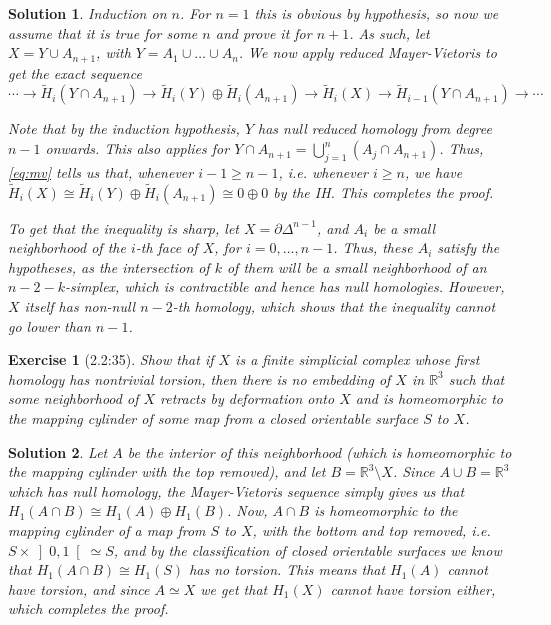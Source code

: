 \documentclass{article}
\theoremstyle{plain}
\newtheorem*{ex}{Exercise}
\theoremstyle{nonumberplain}
\newtheorem{sol}{Solution}
\newcommand{\R}{\mathbb{R}}
\begin{document}
\begin{sol}
Induction on $n$. For $n = 1$ this is obvious by hypothesis, so now we assume that it is true for some $n$ and prove it for $n+1$. As such, let $X = Y \cup A_{n+1}$, with $Y = A_1 \cup \dots \cup A_n$. We now apply reduced Mayer-Vietoris to get the exact sequence
\begin{equation}\label{eq:mv}
\cdots \to \tilde H_i(Y \cap A_{n+1}) \to \tilde H_i(Y) \oplus \tilde H_i(A_{n+1}) \to \tilde H_i(X) \to \tilde H_{i-1}(Y \cap A_{n+1}) \to \cdots
\end{equation}

Note that by the induction hypothesis, $Y$ has null reduced homology from degree $n-1$ onwards. This also applies for $Y \cap A_{n+1} = \bigcup_{j=1}^n (A_j \cap A_{n+1})$. Thus, \eqref{eq:mv} tells us that, whenever $i-1 \geq n-1$, i.e. whenever $i \geq n$, we have $\tilde H_i(X) \cong \tilde H_i(Y) \oplus \tilde H_i(A_{n+1}) \cong 0 \oplus 0$ by the IH. This completes the proof.

To get that the inequality is sharp, let $X = \partial \Delta^{n-1}$, and $A_i$ be a small neighborhood of the $i$-th face of $X$, for $i = 0, \dots, n-1$. Thus, these $A_i$ satisfy the hypotheses, as the intersection of $k$ of them will be a small neighborhood of an $n-2-k$-simplex, which is contractible and hence has null homologies. However, $X$ itself has non-null $n-2$-th homology, which shows that the inequality cannot go lower than $n-1$.
\end{sol}

\begin{ex}[2.2:35]
Show that if $X$ is a finite simplicial complex whose first homology has nontrivial torsion, then there is no embedding of $X$ in $\R^3$ such that some neighborhood of $X$ retracts by deformation onto $X$ and is homeomorphic to the mapping cylinder of some map from a closed orientable surface $S$ to $X$.
\end{ex}

\begin{sol}
Let $A$ be the interior of this neighborhood (which is homeomorphic to the mapping cylinder with the top removed), and let $B = \R^3 \setminus X$. Since $A \cup B = \R^3$ which has null homology, the Mayer-Vietoris sequence simply gives us that $H_1(A \cap B) \cong H_1(A) \oplus H_1(B)$. Now, $A \cap B$ is homeomorphic to the mapping cylinder of a map from $S$ to $X$, with the bottom and top removed, i.e. $S \times \left]0,1\right[ \simeq S$, and by the classification of closed orientable surfaces we know that $H_1(A \cap B) \cong H_1(S)$ has no torsion. This means that $H_1(A)$ cannot have torsion, and since $A \simeq X$ we get that $H_1(X)$ cannot have torsion either, which completes the proof.
\end{sol}
\end{document}
